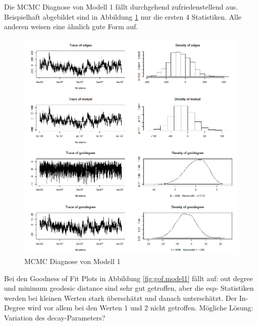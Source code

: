 \documentclass[a4paper,ngerman,oneside,titlepage,bibliography=totoc,11pt]{scrreprt}
\begin{document}
Die MCMC Diagnose von Modell 1 fällt durchgehend zufriedenstellend aus. Beispielhaft abgebildet sind in Abbildung \ref{fig:mcmc.diag.model1} nur die ersten 4 Statistiken. Alle anderen weisen eine ähnlich gute Form auf.



\begin{figure}[ht]
	\centering
		\includegraphics[width=1\textwidth]{../ERGM/mcmcdiagergm3.png}
	\caption{MCMC Diagnose von Modell 1}
	\label{fig:mcmc.diag.model1}
\end{figure}


Bei den Goodness of Fit Plots in Abbildung \ref{fig:gof.model1} fällt auf: out degree und minimum geodesic distance sind sehr gut getroffen, aber die esp- Statistiken werden bei kleinen Werten stark überschätzt und danach unterschätzt. Der In-Degree wird vor allem bei den Werten 1 und 2 nicht getroffen. 
Mögliche Lösung: Variation des decay-Parameters?
\end{document}
